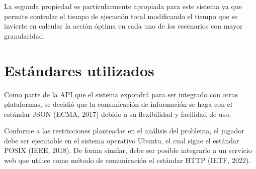 La segunda propiedad es particularmente apropiada para este sistema ya que
permite controlar el tiempo de ejecución total modificando el tiempo que se
invierte en calcular la acción óptima en cada uno de los escenarios con mayor
granularidad.

\section{Estándares utilizados}

Como parte de la API que el sistema expondrá para ser integrado con otras
plataformas, se decidió que la comunicación de información se haga con el
estándar JSON (ECMA, 2017) debido a su flexibilidad y facilidad de uso.

Conforme a las restricciones planteadas en el análisis del problema, el jugador
debe ser ejecutable en el sistema operativo Ubuntu, el cual sigue el estándar
POSIX (IEEE, 2018). De forma similar, debe ser posible integrarlo a un servicio web que
utilice como método de comunicación el estándar HTTP (IETF, 2022).







